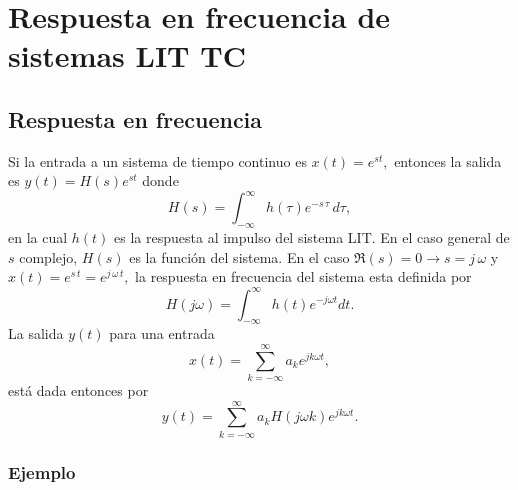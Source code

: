 \chapter{Respuesta en frecuencia de sistemas LIT TC}

\section{Respuesta en frecuencia}

Si la entrada a un sistema de tiempo continuo es $x\left( t\right) =e^{st},$ 
entonces la salida es $y\left( t\right) =H\left( s\right) e^{st}$ donde
\begin{equation}
        H\left( s\right) =\int_{-\infty }^{\infty }h\left( \tau \right) e^{-s \, \tau} \, d\tau ,
\end{equation}
en la cual $h\left( t\right) $ es la respuesta al impulso del sistema LIT.
En el caso general de $s$ complejo, $H\left( s\right) $ es la funci\'{o}n del sistema. 
En el caso $\Re\left( s\right) =0\rightarrow s=j \, \omega $ y $x\left( t\right) =e^{s \, t}=e^{j \, \omega \, t},$ 
la respuesta en frecuencia del sistema esta definida por 
\begin{equation}
        H\left( j\omega \right) =\int_{-\infty }^{\infty }h\left( t\right) e^{-j\omega t}dt.
\end{equation}
La salida $y\left( t\right) $ para una entrada 
\begin{equation}
        x\left( t\right) =\sum_{k=-\infty }^{\infty }a_{k}e^{jk\omega t},
\end{equation}
est\'{a} dada entonces por 
\begin{equation}
        y\left( t\right) =\sum_{k=-\infty }^{\infty }a_{k}H\left( j\omega k\right) e^{jk\omega t}.
\end{equation}

\subsection{Ejemplo}

